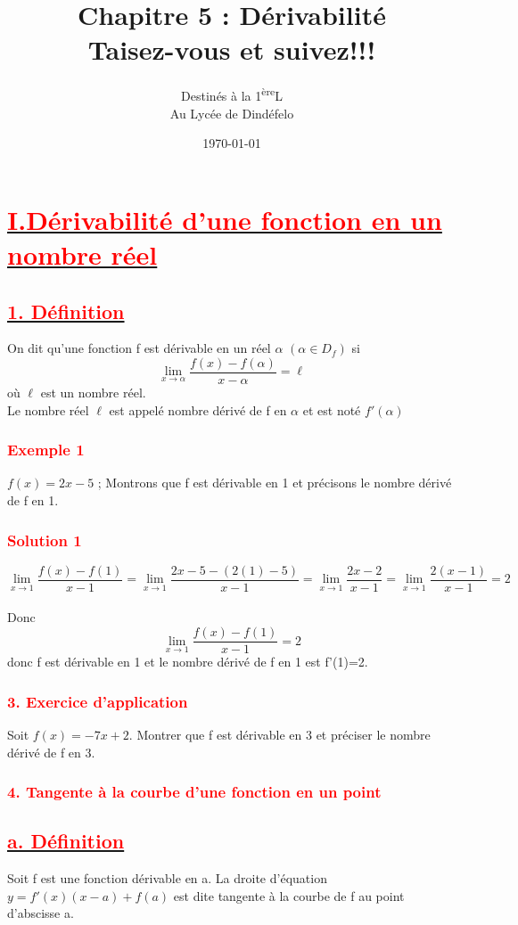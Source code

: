 \documentclass[12pt]{article}
\author{Destinés à la 1\textsuperscript{ère}L\\Au Lycée de Dindéfelo}
\title{\textbf{Chapitre 5 : Dérivabilité\\Taisez-vous et suivez!!!}}
\date{\today}
\begin{document}
\maketitle
\newpage
\section*{\underline{\textbf{\textcolor{red}{I.Dérivabilité d’une fonction en un nombre réel}}}}
\subsection*{\underline{\textbf{\textcolor{red}{1. Définition}}}}
On dit qu’une fonction f est dérivable en un réel $\alpha$ $(\alpha \in D_{f})$ si \[\lim_{x \to \alpha}\frac{f(x)-f(\alpha)}{x-\alpha}=\ell\] où $\ell$ est un nombre réel.\\
Le nombre réel $\ell$ est appelé nombre dérivé de f en $\alpha$ et est noté $f'(\alpha)$
\subsubsection*{\textcolor{red}{Exemple 1}}
$f(x)=2x-5$ ; Montrons que f est dérivable en 1 et précisons le nombre dérivé de f en 1.
\subsubsection*{\textcolor{red}{Solution 1}}
\[\lim_{x \to 1}\frac{f(x)-f(1)}{x-1}=\lim_{x \to 1}\frac{2x-5-(2(1)-5)}{x-1}=\lim_{x \to 1}\frac{2x-2}{x-1}=\lim_{x \to 1}\frac{2(x-1)}{x-1}=2\]\\
Donc \[\lim_{x \to 1}\frac{f(x)-f(1)}{x-1}=2\]donc f est dérivable en 1 et le nombre dérivé de f en 1 est f'(1)=2.
\subsubsection*{\textcolor{red}{3. Exercice d’application}}
Soit $f(x)=-7x+2$. Montrer que f est dérivable en 3 et préciser le nombre dérivé de f en 3.
\subsubsection*{\textcolor{red}{4. Tangente à la courbe d’une fonction en un point}}
\subsection*{\underline{\textbf{\textcolor{red}{a. Définition}}}}
Soit f est une fonction dérivable en a. La droite d’équation\\ $y=f'(x)(x-a)+f(a)$ est dite tangente à la courbe de f au point d’abscisse a.
\end{document}
